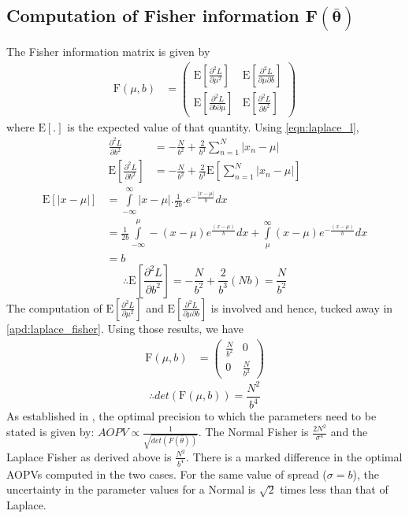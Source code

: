 \documentclass[wcp]{jmlr}
\begin{document}
\subsection*{Computation of Fisher information $\mathbf{F(\bar{\boldsymbol{\theta}})}$}
The Fisher information matrix is given by
\begin{align*}
  \mathrm{F}(\mu,b) &= \left( \begin{array}{cc}
  \mathrm{E} \left[\frac{\partial^2 L}{\partial \mu^2}\right] & \mathrm{E} \left[\frac{\partial^2 L}{\partial\mu \partial b}\right] \\
  \mathrm{E} \left[\frac{\partial^2 L}{\partial b \partial\mu}\right] & \mathrm{E} \left[\frac{\partial^2 L}{\partial b^2}\right] 
  \end{array} \right) 
\end{align*}
where $\mathrm{E}[.]$ is the expected value of that quantity. Using \eqref{eqn:laplace_l},
\begin{align*}
 \frac{\partial^2 L}{\partial b^2} &= -\frac{N}{b^2} + \frac{2}{b^3} \sum_{n=1}^N |x_n-\mu| \\
 \mathrm{E} \left[\frac{\partial^2 L}{\partial b^2}\right] &= -\frac{N}{b^2} + \frac{2}{b^3} \mathrm{E}\left[\sum_{n=1}^N |x_n-\mu|\right]
\end{align*}
\begin{align*}
 \mathrm{E}\left[|x-\mu|\right] &= \int\limits_{-\infty}^{\infty} |x-\mu| . \frac{1}{2b} . e^{-\frac{|x-\mu|}{b}} dx \\
 &= \frac{1}{2b} \int\limits_{-\infty}^{\mu} -(x-\mu) e^{\frac{(x-\mu)}{b}} dx + \int\limits_{\mu}^{\infty} (x-\mu)e^{-\frac{(x-\mu)}{b}} dx \\
 &= b
\end{align*}
\begin{equation*}
 \therefore \mathrm{E} \left[\frac{\partial^2 L}{\partial b^2}\right] = -\frac{N}{b^2} + \frac{2}{b^3} (Nb) = \frac{N}{b^2} 
\end{equation*}
The computation of $\mathrm{E}\left[\frac{\partial^2 L}{\partial \mu^2}\right]$ and 
$\mathrm{E}\left[\frac{\partial^2 L}{\partial \mu \partial b}\right]$ is involved and hence,
tucked away in \autoref{apd:laplace_fisher}. Using those results, we have
\begin{align*}
  \mathrm{F}(\mu,b) &= \left( \begin{array}{cc}
        \frac{N}{b^2} & 0 \\
        0 & \frac{N}{b^2}
            \end{array} \right) 
\end{align*}
\begin{equation} \therefore det(\mathrm{F}(\mu,b)) = \frac{N^2}{b^4} \label{eqn:laplace_fisher} \end{equation}
As established in \citet{oliver1994mml}, the optimal precision to which the parameters need
to be stated is given by: $AOPV \propto \frac{1}{\sqrt{det(F(\bar{\theta}))}}$.
The Normal Fisher is $\frac{2N^2}{\sigma^4}$ \citep{WallaceBook} and the Laplace Fisher 
as derived above is $\frac{N^2}{b^4}$. There is a marked difference in the optimal AOPVs
computed in the two cases. For the same value of spread ($\sigma=b$), the uncertainty in
the parameter values for a Normal is $\sqrt{2}$ times less than that of Laplace.
\end{document}
